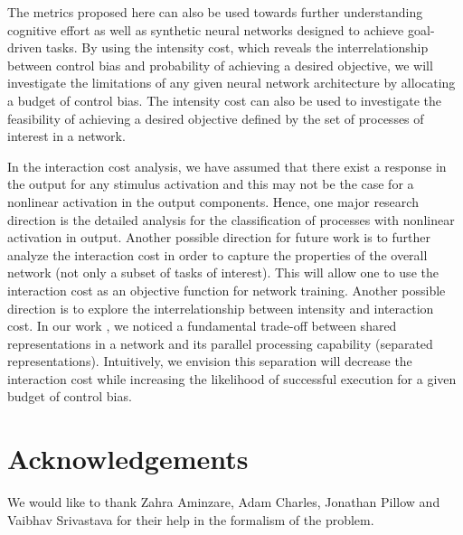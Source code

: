 \documentclass[10pt,letterpaper]{article}
\begin{document}
The metrics proposed here can also be used towards further understanding cognitive effort  as well as synthetic neural networks designed to achieve goal-driven tasks. By using the intensity cost, which reveals the interrelationship between control bias and probability of achieving a desired objective, we will investigate the limitations of any given neural network architecture by allocating a budget of control bias. The intensity cost can also be used to investigate the feasibility of achieving a desired objective defined by the set of processes of interest in a network. 

In the interaction cost analysis, we have assumed that there exist a response in the output for any stimulus activation and this may not be the case for a nonlinear activation in the output components. Hence, one major research direction is the detailed analysis for the classification of processes with nonlinear activation in output. Another possible direction for future work is to further analyze the interaction cost in order to capture the properties of the overall network (not only a subset of tasks of interest). This will allow one to use the interaction cost as an objective function for network training. Another possible direction is to explore the interrelationship between intensity and interaction cost. In our work \cite{CogSci_2016}, we noticed  a fundamental trade-off between shared representations in a network and its parallel processing capability (separated representations). Intuitively, we envision this separation will decrease the interaction cost while increasing the likelihood of successful execution for a given budget of control bias. 
%
%
\section*{Acknowledgements}
We would like to thank Zahra Aminzare, Adam Charles, Jonathan Pillow and Vaibhav Srivastava for their help in the formalism of the problem.
%
%
%

\setlength{\bibleftmargin}{.125in}
\setlength{\bibindent}{-\bibleftmargin}

%
%
%
\end{document}
